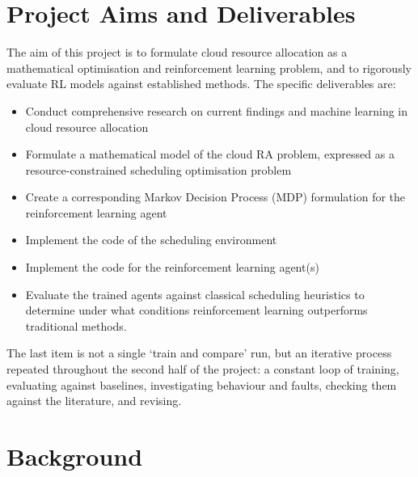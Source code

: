 \documentclass[12pt]{article}
\providecommand{\DIFaddtex}[1]{{\color{red}#1}} %
\providecommand{\DIFdeltex}[1]{} %
\providecommand{\DIFaddbegin}{} %
\providecommand{\DIFaddend}{} %
\providecommand{\DIFdelbegin}{} %
\providecommand{\DIFdelend}{} %
\providecommand{\DIFadd}[1]{\texorpdfstring{\DIFaddtex{#1}}{#1}} %
\providecommand{\DIFdel}[1]{\texorpdfstring{\DIFdeltex{#1}}{}} %
\providecommand{\DIFscaledelfig}{0.5}
\newlength{\DIFdelgraphicswidth} %
\newlength{\DIFdelgraphicsheight} %
\providecommand{\DIFaddincludegraphics}[2][]{{\color{blue}\fbox{\DIFOincludegraphics[#1]{#2}}}} %
\providecommand{\DIFdelincludegraphics}[2][]{%
\sbox{\DIFdelgraphicsbox}{\DIFOincludegraphics[#1]{#2}}%
\settoboxwidth{\DIFdelgraphicswidth}{\DIFdelgraphicsbox} %
\settoboxtotalheight{\DIFdelgraphicsheight}{\DIFdelgraphicsbox} %
\scalebox{\DIFscaledelfig}{%
\parbox[b]{\DIFdelgraphicswidth}{\usebox{\DIFdelgraphicsbox}\\[-\baselineskip] \rule{\DIFdelgraphicswidth}{0em}}\llap{\resizebox{\DIFdelgraphicswidth}{\DIFdelgraphicsheight}{%
\setlength{\unitlength}{\DIFdelgraphicswidth}%
\begin{picture}(1,1)%
\thicklines\linethickness{2pt} %
{\color[rgb]{1,0,0}\put(0,0){\framebox(1,1){}}}%
{\color[rgb]{1,0,0}\put(0,0){\line( 1,1){1}}}%
{\color[rgb]{1,0,0}\put(0,1){\line(1,-1){1}}}%
\end{picture}%
}\hspace*{3pt}}} %
} %
\DeclareRobustCommand{\DIFaddbegin}{\DIFOaddbegin \let\includegraphics\DIFaddincludegraphics} %
\DeclareRobustCommand{\DIFaddend}{\DIFOaddend \let\includegraphics\DIFOincludegraphics} %
\DeclareRobustCommand{\DIFdelbegin}{\DIFOdelbegin \let\includegraphics\DIFdelincludegraphics} %
\DeclareRobustCommand{\DIFdelend}{\DIFOaddend \let\includegraphics\DIFOincludegraphics} %
\begin{document}
\newpage
\section{Project \DIFaddbegin \DIFadd{Aims and }\DIFaddend Deliverables}
The aim of this project is to formulate cloud resource allocation as a mathematical optimisation and reinforcement learning problem\DIFdelbegin \DIFdel{. Implementing and rigorously evaluating }\DIFdelend \DIFaddbegin \DIFadd{, and to rigorously evaluate }\DIFaddend RL models against established methods. The specific deliverables are:
\begin{itemize}
    \item Conduct comprehensive research on current findings and machine learning in cloud resource allocation
    \item Formulate a mathematical model of the cloud RA problem, expressed as a resource-constrained scheduling optimisation problem
    \item Create a corresponding Markov Decision Process (MDP) formulation \DIFdelbegin \DIFdel{of }\DIFdelend \DIFaddbegin \DIFadd{for }\DIFaddend the reinforcement learning agent
    \item Implement the code of the scheduling environment
    \item Implement the code for the reinforcement learning agent(s)
    \item Evaluate the trained agents against classical scheduling heuristics to determine under what conditions reinforcement learning outperforms traditional methods.
\end{itemize}
The last item is not \DIFdelbegin \DIFdel{done with }\DIFdelend a single `train and compare' run, but \DIFdelbegin \DIFdel{is }\DIFdelend an iterative process repeated throughout the \DIFdelbegin \DIFdel{entire last }\DIFdelend \DIFaddbegin \DIFadd{second }\DIFaddend half of the project\DIFdelbegin \DIFdel{. A }\DIFdelend \DIFaddbegin \DIFadd{: a }\DIFaddend constant loop of training, evaluating against baselines, \DIFdelbegin \DIFdel{examining and researching }\DIFdelend \DIFaddbegin \DIFadd{investigating }\DIFaddend behaviour and faults, \DIFaddbegin \DIFadd{checking them against the literature, }\DIFaddend and revising.

\section{Background}
\end{document}
